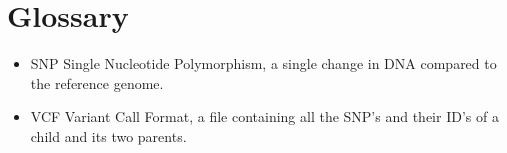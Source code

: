 \section{Glossary}
	\begin{itemize}
		\item SNP
			\subitem Single Nucleotide Polymorphism, a single change in DNA compared to the reference genome.
		\item VCF
			\subitem Variant Call Format, a file containing all the SNP's and their ID's of a child and its two parents.
	\end{itemize}
